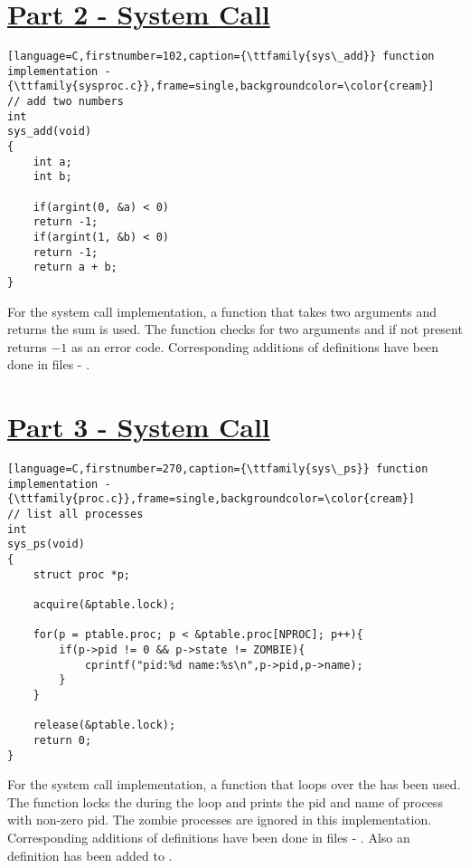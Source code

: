 \documentclass[12pt]{article}
\begin{document}
\section*{\underline{Part 2 - {} System Call}}
\begin{addmargin}[0.7in]{0in}
\begin{lstlisting}[language=C,firstnumber=102,caption={\ttfamily{sys\_add}} function implementation - {\ttfamily{sysproc.c}},frame=single,backgroundcolor=\color{cream}]
// add two numbers
int
sys_add(void)
{
    int a;
    int b;

    if(argint(0, &a) < 0)
    return -1;
    if(argint(1, &b) < 0)
    return -1;
    return a + b;
}
\end{lstlisting}
\end{addmargin}

\begin{addmargin}[0.1in]{0in}
    For the {} system call implementation, a function that takes two arguments and returns the sum is used. The function checks for two arguments and if not present returns $-1$ as an error code. Corresponding additions of definitions have been done in files - {}.
\end{addmargin}

\section*{\underline{Part 3 - {} System Call}}
\begin{addmargin}[0.7in]{0in}
\begin{lstlisting}[language=C,firstnumber=270,caption={\ttfamily{sys\_ps}} function implementation - {\ttfamily{proc.c}},frame=single,backgroundcolor=\color{cream}]
// list all processes
int
sys_ps(void)
{
    struct proc *p;
    
    acquire(&ptable.lock);

    for(p = ptable.proc; p < &ptable.proc[NPROC]; p++){
        if(p->pid != 0 && p->state != ZOMBIE){
            cprintf("pid:%d name:%s\n",p->pid,p->name);
        }
    }

    release(&ptable.lock);
    return 0;
}
\end{lstlisting}
\end{addmargin}

\vspace{5mm}
\begin{addmargin}[0.1in]{0in}
    For the {} system call implementation, a function that loops over the {} has been used. The function locks the {} during the loop and prints the pid and name of process with non-zero pid. The zombie processes are ignored in this implementation. Corresponding additions of definitions have been done in files - {}. Also an {} definition has been added to {}.
\end{addmargin}
\end{document}

